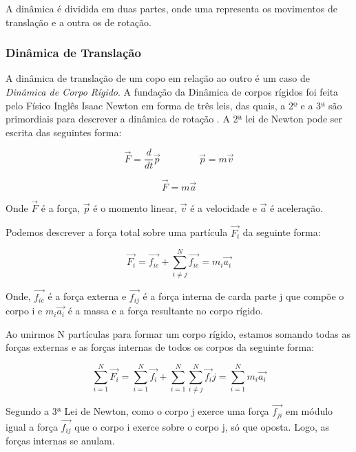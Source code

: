 A dinâmica é dividida em duas partes, onde uma representa os movimentos de translação e a outra os de rotação.

\subsubsection{Dinâmica de Translação}

A dinâmica de translação de um copo em relação ao outro é um caso de \textit{Dinâmica de Corpo Rígido}. A fundação da Dinâmica de corpos rígidos foi feita pelo Físico Inglês Isaac Newton em forma de três leis, das quais, a 2º e a 3ª são primordiais para descrever a dinâmica de rotação \cite{Snider}. A 2ª lei de Newton pode ser escrita das seguintes forma:

\begin{equation}\label{eq:fma}
  \vec{F}=\frac{d}{dt}\vec{p}\quad\quad\quad\quad\vec{p}=m\vec{v}
\end{equation}

\begin{equation}
  \vec{F}=m\vec{a}
\end{equation}

Onde $\vec{F}$ é a força, $\vec{p}$ é o momento linear, $\vec{v}$ é a velocidade e $\vec{a}$ é  aceleração.

Podemos descrever a força total sobre uma partícula $\vec{F_i}$ da seguinte forma:

\begin{equation}\label{eq:Fi}
\vec{F_i}=\vec{f_{ie}}+\sum_{i\neq j}^{N}{\vec{f_{ie}}} = m_i\vec{a_i}
\end{equation}
 
 Onde, $\vec{f_{ie}}$ é a força externa e $\vec{f_{ij}}$ é a força interna de carda parte j que compõe o corpo i e $m_i\vec{a_i}$ é a massa e a força resultante no corpo rígido.

 Ao unirmos N partículas para formar um corpo rígido, estamos somando todas as forças externas e as forças internas de todos os corpos da seguinte forma:

\begin{equation}
  \sum_{i=1}^{N}{\vec{F_i}}=\sum_{i=1}^{N}{\vec{f_i}}+\sum_{i=1}^{N}{\sum_{i\neq j}^{N}{\vec{f_i}j=}}\sum_{i=1}^{N}{m_i\vec{a_i}} 
\end{equation}

Segundo a 3ª Lei de Newton, como o corpo j exerce uma força $\vec{f_{ji}}$ em módulo igual a força $\vec{f_{ij}}$ que o corpo i exerce sobre o corpo j, só que oposta. Logo, as forças internas se anulam.  


